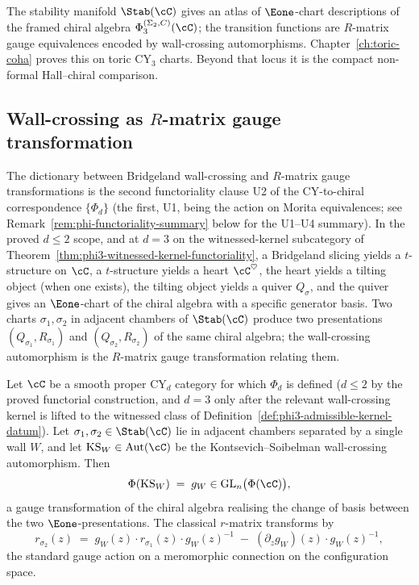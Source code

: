 The stability manifold $\Stab(\cC)$ gives an atlas of $\Eone$-chart
descriptions of the framed chiral algebra
$\Phi_3^{(\Sigma_2,C)}(\cC)$; the transition functions are
$R$-matrix gauge equivalences encoded by wall-crossing automorphisms.
Chapter~\ref{ch:toric-coha} proves this on toric CY$_3$ charts. Beyond
that locus it is the compact non-formal Hall--chiral comparison.

\subsection{Wall-crossing as \texorpdfstring{$R$}{R}-matrix gauge transformation}
\label{subsec:wallcrossing-rmatrix}

The dictionary between Bridgeland wall-crossing and $R$-matrix gauge transformations is the second functoriality clause U2 of the CY-to-chiral correspondence $\{\Phi_d\}$ (the first, U1, being the action on Morita equivalences; see Remark~\ref{rem:phi-functoriality-summary} below for the U1--U4 summary). In the proved $d \leq 2$ scope, and at $d = 3$ on the witnessed-kernel subcategory of Theorem~\ref{thm:phi3-witnessed-kernel-functoriality}, a Bridgeland slicing yields a $t$-structure on $\cC$, a $t$-structure yields a heart $\cC^\heartsuit$, the heart yields a tilting object (when one exists), the tilting object yields a quiver $Q_\sigma$, and the quiver gives an $\Eone$-chart of the chiral algebra with a specific generator basis. Two charts $\sigma_1, \sigma_2$ in adjacent chambers of $\Stab(\cC)$ produce two presentations $(Q_{\sigma_1}, R_{\sigma_1})$ and $(Q_{\sigma_2}, R_{\sigma_2})$ of the same chiral algebra; the wall-crossing automorphism is the $R$-matrix gauge transformation relating them.

\begin{conjecture}
\label{conj:wallcrossing-dictionary}
\ClaimStatusConjectured
Let $\cC$ be a smooth proper CY$_d$ category for which $\Phi_d$ is defined ($d \leq 2$ by the proved functorial construction, and $d = 3$ only after the relevant wall-crossing kernel is lifted to the witnessed class of Definition~\ref{def:phi3-admissible-kernel-datum}). Let $\sigma_1, \sigma_2 \in \Stab(\cC)$ lie in adjacent chambers separated by a single wall $W$, and let $\mathrm{KS}_W \in \mathrm{Aut}(\cC)$ be the Kontsevich--Soibelman wall-crossing automorphism. Then
\[
 \Phi(\mathrm{KS}_W) \;=\; g_W \in \mathrm{GL}_n\bigl(\Phi(\cC)\bigr),
\]
a gauge transformation of the chiral algebra realising the change of basis between the two $\Eone$-presentations. The classical $r$-matrix transforms by
\[
 r_{\sigma_2}(z) \;=\; g_W(z) \cdot r_{\sigma_1}(z) \cdot g_W(z)^{-1} \;-\; (\partial_z g_W)(z) \cdot g_W(z)^{-1},
\]
the standard gauge action on a meromorphic connection on the configuration space.
\end{conjecture}

